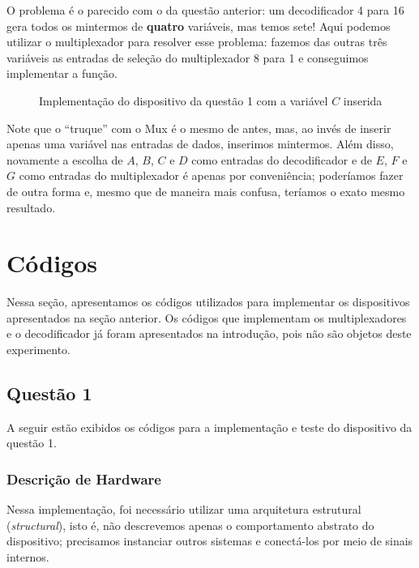 \documentclass[a4paper,12pt]{article}
\begin{document}
O problema é o parecido com o da questão anterior: um decodificador 4 para 16 gera todos os mintermos de \textbf{quatro} variáveis, mas temos sete! Aqui podemos utilizar o multiplexador para resolver esse problema: fazemos das outras três variáveis as entradas de seleção do multiplexador 8 para 1 e conseguimos implementar a função.

\begin{figure}[H]
    \centering
    
    \caption{Implementação do dispositivo da questão 1 com a variável $C$ inserida}
    \label{fig:enter-label}
\end{figure}


Note que o ``truque'' com o Mux é o mesmo de antes, mas, ao invés de inserir apenas uma variável nas entradas de dados, inserimos mintermos. Além disso, novamente a escolha de $A$, $B$, $C$ e $D$ como entradas do decodificador e de $E$, $F$ e $G$ como entradas do multiplexador é apenas por conveniência; poderíamos fazer de outra forma e, mesmo que de maneira mais confusa, teríamos o exato mesmo resultado.

\section{Códigos} \label{sec: codigos}
 Nessa seção, apresentamos os códigos utilizados para implementar os dispositivos apresentados na seção anterior. Os códigos que implementam os multiplexadores e o decodificador já foram apresentados na introdução, pois não são objetos deste experimento.

\subsection{Questão 1} \label{subsec: q1}
 A seguir estão exibidos os códigos para a implementação e teste do dispositivo da questão 1. 

\subsubsection{Descrição de Hardware}
 Nessa implementação, foi necessário utilizar uma arquitetura estrutural (\textit{structural}), isto é, não descrevemos apenas o comportamento abstrato do dispositivo; precisamos instanciar outros sistemas e conectá-los por meio de sinais internos.
\end{document}
